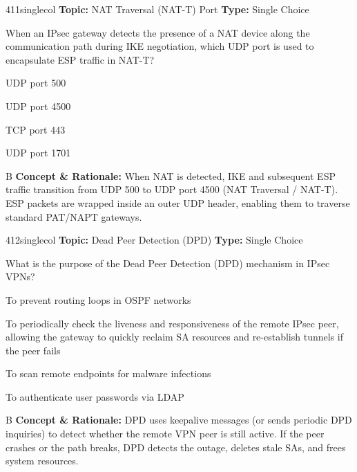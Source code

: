 \begin{qcard}{411}{singlecol}
\textcolor{darkslate!75}{\small\textbf{Topic:} NAT Traversal (NAT-T) Port \hfill \textbf{Type:} Single Choice}\vspace{0.4em}\par
When an IPsec gateway detects the presence of a NAT device along the communication path during IKE negotiation, which UDP port is used to encapsulate ESP traffic in NAT-T?
\begin{qoptions}
\item UDP port 500
\item UDP port 4500
\item TCP port 443
\item UDP port 1701
\end{qoptions}
\end{qcard}
\nopagebreak
\begin{explainbox}{B}
\textbf{Concept \& Rationale:} When NAT is detected, IKE and subsequent ESP traffic transition from UDP 500 to UDP port 4500 (NAT Traversal / NAT-T). ESP packets are wrapped inside an outer UDP header, enabling them to traverse standard PAT/NAPT gateways.
\end{explainbox}

\begin{qcard}{412}{singlecol}
\textcolor{darkslate!75}{\small\textbf{Topic:} Dead Peer Detection (DPD) \hfill \textbf{Type:} Single Choice}\vspace{0.4em}\par
What is the purpose of the Dead Peer Detection (DPD) mechanism in IPsec VPNs?
\begin{qoptions}
\item To prevent routing loops in OSPF networks
\item To periodically check the liveness and responsiveness of the remote IPsec peer, allowing the gateway to quickly reclaim SA resources and re-establish tunnels if the peer fails
\item To scan remote endpoints for malware infections
\item To authenticate user passwords via LDAP
\end{qoptions}
\end{qcard}
\nopagebreak
\begin{explainbox}{B}
\textbf{Concept \& Rationale:} DPD uses keepalive messages (or sends periodic DPD inquiries) to detect whether the remote VPN peer is still active. If the peer crashes or the path breaks, DPD detects the outage, deletes stale SAs, and frees system resources.
\end{explainbox}

